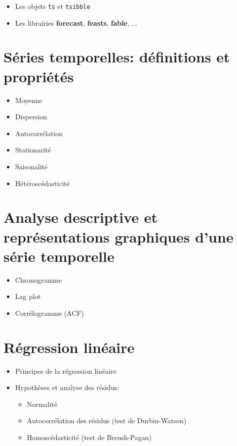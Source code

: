 \documentclass{article}
\begin{document}
\begin{itemize}[noitemsep]
\item Les objets \texttt{ts} et \texttt{tsibble}
\item Les librairies \textbf{forecast}, \textbf{feasts}, \textbf{fable}, ...
\end{itemize}

\section{Séries temporelles: définitions et propriétés}

\begin{itemize}[noitemsep]
\item Moyenne
\item Dispersion 
\item Autocorrélation
\item Stationarité
\item Saisonalité
\item Hétéroscédasticité
\end{itemize}


\section{Analyse descriptive et représentations graphiques d’une série temporelle}

\begin{itemize}[noitemsep]
\item Chronogramme
\item Lag plot
\item Corrélogramme (ACF)
\end{itemize}

\section{Régression linéaire}

\begin{itemize}[noitemsep]
\item Principes de la régression linéaire
\item Hypothèses et analyse des résidus: 
\begin{itemize}[noitemsep]
\item Normalité
\item Autocorrélation des résidus (test de Durbin-Watson)
\item Homoscédasticité (test de  Breush-Pagan)
\end{itemize}
\end{itemize}
\end{document}
